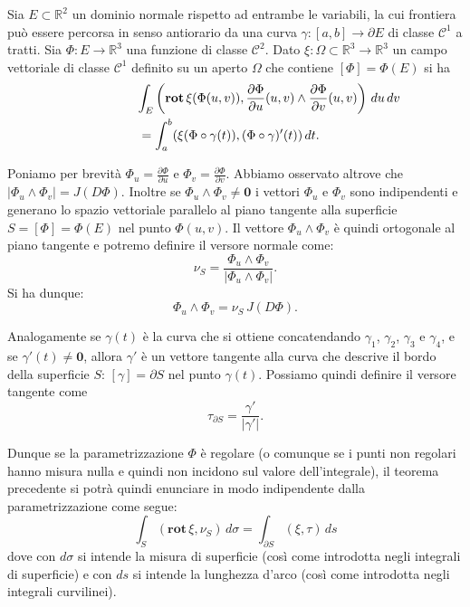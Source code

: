 \documentclass[italian,a4paper]{scrartcl}
\newcommand{\RR}{{\mathbb R}}
\newcommand{\C}{{\mathcal C}}
\renewcommand{\vec}{\mathbf}
\newcommand{\rot}{\mathbf{rot}\,}
\begin{document}
\begin{theorem}
Sia $E\subset \RR^2$ un dominio normale rispetto ad entrambe le
variabili, la cui frontiera può essere percorsa in senso antiorario
da una curva $\gamma\colon[a,b]\to \partial E$ di classe $\C^1$ a tratti.
Sia $\Phi\colon E \to \RR^3$ una funzione di classe $\mathcal C^2$. 
Dato $\xi\colon \Omega\subset \RR^3\to \RR^3$ 
un campo vettoriale di classe $\mathcal C^1$ definito su un aperto
$\Omega$ che contiene $[\Phi]=\Phi(E)$
si ha
\begin{align*}
\lefteqn{\int_E \left(\rot \xi(\Phi(u,v)),\frac{\partial \Phi}{\partial u}(u,v) \wedge \frac{\partial \Phi}{\partial v}(u,v)\right)\, du\, dv}\\
&=
\int_a^b (\xi(\Phi\circ \gamma(t)), (\Phi\circ \gamma)'(t))\, dt.
\end{align*}
\end{theorem}
Poniamo per brevità $\Phi_u = \frac{\partial \Phi}{\partial u}$ e
$\Phi_v = \frac{\partial \Phi}{\partial v}$. Abbiamo osservato altrove
che $\lvert \Phi_u\wedge \Phi_v\rvert = J(D\Phi)$. Inoltre se $\Phi_u
\wedge \Phi_v \neq \vec 0$ i vettori $\Phi_u$ e $\Phi_v$ sono
indipendenti e generano lo spazio vettoriale parallelo al piano
tangente alla superficie $S=[\Phi]=\Phi(E)$ nel punto $\Phi(u,v)$.
Il vettore $\Phi_u \wedge \Phi_v$ è quindi ortogonale al piano
tangente e potremo definire il versore normale come:
\[
 \nu_S = \frac{\Phi_u \wedge \Phi_v}{\lvert \Phi_u \wedge \Phi_v\rvert}.
\]
Si ha dunque:
\[
 \Phi_u \wedge \Phi_v = \nu_S\, J(D\Phi).
\]

Analogamente se $\gamma(t)$ è la curva che si ottiene concatendando
$\gamma_1$, $\gamma_2$, $\gamma_3$ e $\gamma_4$, e se $\gamma'(t) \neq \vec
0$, allora $\gamma'$ è un vettore tangente alla curva che descrive il
bordo della superficie $S$: $[\gamma]=\partial S$ nel
punto $\gamma(t)$. Possiamo quindi definire il versore tangente come
\[
  \tau_{\partial S} = \frac{\gamma'}{\lvert \gamma'\rvert}.
\]

Dunque se la parametrizzazione $\Phi$ è regolare (o comunque se i
punti non regolari hanno misura nulla e quindi non incidono sul valore
dell'integrale),
il teorema precedente si potrà quindi enunciare in modo indipendente
dalla parametrizzazione come segue:
\[
\int_S (\rot \xi, \nu_S)\, d\sigma = \int_{\partial S} (\xi,\tau)\, ds
\]
dove con $d\sigma$ si intende la misura di superficie (così come
introdotta negli integrali di superficie) e con $ds$ si intende la
lunghezza d'arco (così come introdotta negli integrali curvilinei).
\end{document}
